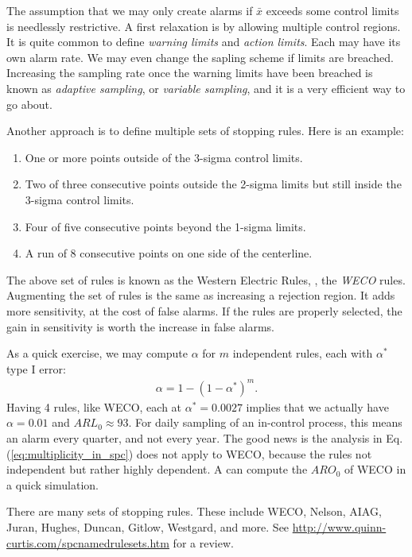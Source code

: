 The assumption that we may only create alarms if $\bar{x}$ exceeds some control limits is needlessly restrictive.
A first relaxation is by allowing multiple control regions.
It is quite common to define \emph{warning limits} and \emph{action limits}. Each may have its own alarm rate.
We may even change the sapling scheme if limits are breached. Increasing the sampling rate once the warning limits have been breached is known as \emph{adaptive sampling}, or \emph{variable sampling}, and it is a very efficient way to go about. 



Another approach is to define multiple sets of stopping rules.
Here is an example:
\begin{enumerate}
\item One or more points outside of the 3-sigma control limits.
\item Two of three consecutive points outside the 2-sigma limits but still inside the 3-sigma control limits.
\item Four of five consecutive points beyond the 1-sigma limits.
\item A run of 8 consecutive points on one side of the centerline.
\end{enumerate}
The above set of rules is known as the Western Electric Rules, \aka, the \emph{WECO} rules.
Augmenting the set of rules is the same as increasing a rejection region. It adds more sensitivity, at the cost of false alarms. If the rules are properly selected, the gain in sensitivity is worth the increase in false alarms.

As a quick exercise, we may compute $\alpha$  for $m$ independent rules, each with $\alpha^*$ type I error:
\begin{align}
\label{eq:multiplicity_in_spc}
	\alpha=1-(1-\alpha^*)^m.
\end{align}
Having 4 rules, like WECO, each at $\alpha^*=0.0027$ implies that we actually have $\alpha=0.01$ and $ARL_0 \approx 93$. For daily sampling of an in-control process, this means an alarm every quarter, and not every year. 
The good news is the analysis in Eq.(\ref{eq:multiplicity_in_spc}) does not apply to WECO, because the rules not independent but rather highly dependent. 
A can compute the $ARO_0$ of WECO in a quick simulation.

\begin{extra}
There are many sets of stopping rules. 
These include WECO, Nelson, AIAG, Juran, Hughes, Duncan, Gitlow, Westgard, and more. 
See \url{http://www.quinn-curtis.com/spcnamedrulesets.htm} for a review.
\end{extra}







